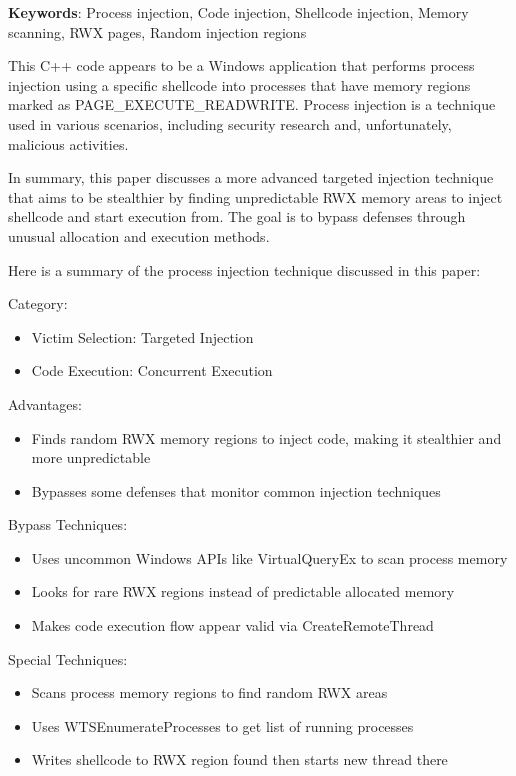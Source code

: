 \documentclass{article}
\begin{document}
\textbf{Keywords}: Process injection, Code injection, Shellcode injection, Memory scanning, RWX pages, Random injection regions

This C++ code appears to be a Windows application that performs process injection using a specific shellcode into processes that have memory regions marked as PAGE\_EXECUTE\_READWRITE. Process injection is a technique used in various scenarios, including security research and, unfortunately, malicious activities.


In summary, this paper discusses a more advanced targeted injection technique that aims to be stealthier by finding unpredictable RWX memory areas to inject shellcode and start execution from. The goal is to bypass defenses through unusual allocation and execution methods.

Here is a summary of the process injection technique discussed in this paper:

Category:
\begin{itemize}
\item Victim Selection: Targeted Injection
\item Code Execution: Concurrent Execution
\end{itemize}

Advantages:
\begin{itemize}
\item Finds random RWX memory regions to inject code, making it stealthier and more unpredictable
\item Bypasses some defenses that monitor common injection techniques
\end{itemize}

Bypass Techniques:
\begin{itemize}
\item Uses uncommon Windows APIs like VirtualQueryEx to scan process memory
\item Looks for rare RWX regions instead of predictable allocated memory
\item Makes code execution flow appear valid via CreateRemoteThread
\end{itemize}

Special Techniques:
\begin{itemize}
\item Scans process memory regions to find random RWX areas
\item Uses WTSEnumerateProcesses to get list of running processes
\item Writes shellcode to RWX region found then starts new thread there
\end{itemize}
\end{document}
